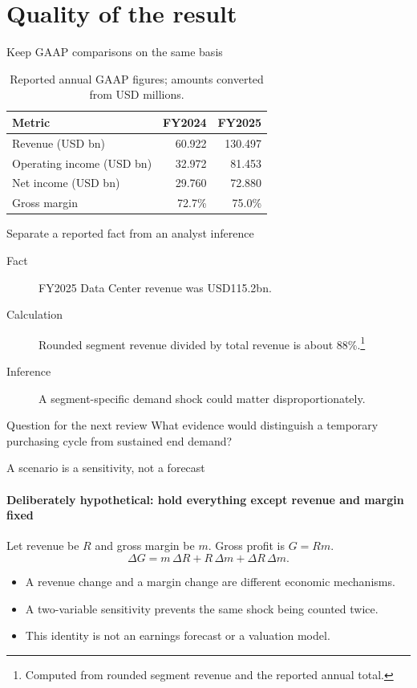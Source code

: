\documentclass[11pt,aspectratio=169]{beamer}
\begin{document}
\section{Quality of the result}
\begin{frame}{Keep GAAP comparisons on the same basis}
\begin{table}
\centering
\begin{tabular}{lrr}
\toprule
Metric & FY2024 & FY2025\\\midrule
Revenue (USD bn) & 60.922 & 130.497\\
Operating income (USD bn) & 32.972 & 81.453\\
Net income (USD bn) & 29.760 & 72.880\\
Gross margin & 72.7\% & 75.0\%\\\bottomrule
\end{tabular}
\caption{Reported annual GAAP figures; amounts converted from USD millions.}
\end{table}
\end{frame}
\begin{frame}{Separate a reported fact from an analyst inference}
\begin{description}
\item[Fact] FY2025 Data Center revenue was USD115.2bn.
\item[Calculation] Rounded segment revenue divided by total revenue is about 88\%.\footnote{Computed from rounded segment revenue and the reported annual total.}
\item[Inference] A segment-specific demand shock could matter disproportionately.
\end{description}
\pause
\begin{alertblock}{Question for the next review}
What evidence would distinguish a temporary purchasing cycle from sustained end demand?
\end{alertblock}
\end{frame}
\begin{frame}{A scenario is a sensitivity, not a forecast}
\framesubtitle{Deliberately hypothetical: hold everything except revenue and margin fixed}
Let revenue be $R$ and gross margin be $m$. Gross profit is $G=Rm$.
\[
 \Delta G=m\,\Delta R+R\,\Delta m+\Delta R\,\Delta m.
\]
\begin{itemize}[<+->]
\item A revenue change and a margin change are different economic mechanisms.
\item A two-variable sensitivity prevents the same shock being counted twice.
\item This identity is not an earnings forecast or a valuation model.
\end{itemize}
\end{frame}
\end{document}
